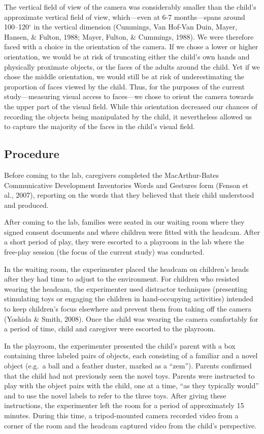 \documentclass[a4paper,man,apacite,floatsintext,longtable]{apa6}
\begin{document}
The vertical field of view of the camera was considerably smaller than
the child's approximate vertical field of view, which---even at 6-7
months---spans around 100--120\(^{\circ}\) in the vertical dimension
(Cummings, Van Hof-Van Duin, Mayer, Hansen, \& Fulton, 1988; Mayer,
Fulton, \& Cummings, 1988). We were therefore faced with a choice in the
orientation of the camera. If we chose a lower or higher orientation, we
would be at risk of truncating either the child's own hands and
physically proximate objects, or the faces of the adults around the
child. Yet if we chose the middle orientation, we would still be at risk
of underestimating the proportion of faces viewed by the child. Thus,
for the purposes of the current study---measuring visual access to
faces---we chose to orient the camera towards the upper part of the
visual field. While this orientation decreased our chances of recording
the objects being manipulated by the child, it nevertheless allowed us
to capture the majority of the faces in the child's visual field.

\subsection{Procedure}\label{procedure}

Before coming to the lab, caregivers completed the MacArthur-Bates
Communicative Development Inventories Words and Gestures form (Fenson et
al., 2007), reporting on the words that they believed that their child
understood and produced.

After coming to the lab, families were seated in our waiting room where
they signed consent documents and where children were fitted with the
headcam. After a short period of play, they were escorted to a playroom
in the lab where the free-play session (the focus of the current study)
was conducted.

In the waiting room, the experimenter placed the headcam on children's
heads after they had time to adjust to the environment. For children who
resisted wearing the headcam, the experimenter used distractor
techniques (presenting stimulating toys or engaging the children in
hand-occupying activities) intended to keep children's focus elsewhere
and prevent them from taking off the camera (Yoshida \& Smith, 2008).
Once the child was wearing the camera comfortably for a period of time,
child and caregiver were escorted to the playroom.

In the playroom, the experimenter presented the child's parent with a
box containing three labeled pairs of objects, each consisting of a
familiar and a novel object (e.g.~a ball and a feather duster, marked as
a ``zem''). Parents confirmed that the child had not previously seen the
novel toys. Parents were instructed to play with the object pairs with
the child, one at a time, ``as they typically would'' and to use the
novel labels to refer to the three toys. After giving these
instructions, the experimenter left the room for a period of
approximately 15 minutes. During this time, a tripod-mounted camera
recorded video from a corner of the room and the headcam captured video
from the child's perspective.
\end{document}
